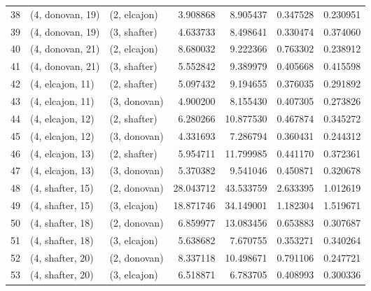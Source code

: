 \begin{tabular}{lllrrrr}
38 &  (4, donovan, 19) &     (2, elcajon) &   3.908868 &   8.905437 &   0.347528 &  0.230951 \\
39 &  (4, donovan, 19) &     (3, shafter) &   4.633733 &   8.498641 &   0.330474 &  0.374060 \\
40 &  (4, donovan, 21) &     (2, elcajon) &   8.680032 &   9.222366 &   0.763302 &  0.238912 \\
41 &  (4, donovan, 21) &     (3, shafter) &   5.552842 &   9.389979 &   0.405668 &  0.415598 \\
42 &  (4, elcajon, 11) &     (2, shafter) &   5.097432 &   9.194655 &   0.376035 &  0.291892 \\
43 &  (4, elcajon, 11) &     (3, donovan) &   4.900200 &   8.155430 &   0.407305 &  0.273826 \\
44 &  (4, elcajon, 12) &     (2, shafter) &   6.280266 &  10.877530 &   0.467874 &  0.345272 \\
45 &  (4, elcajon, 12) &     (3, donovan) &   4.331693 &   7.286794 &   0.360431 &  0.244312 \\
46 &  (4, elcajon, 13) &     (2, shafter) &   5.954711 &  11.799985 &   0.441170 &  0.372361 \\
47 &  (4, elcajon, 13) &     (3, donovan) &   5.370382 &   9.541046 &   0.450871 &  0.320678 \\
48 &  (4, shafter, 15) &     (2, donovan) &  28.043712 &  43.533759 &   2.633395 &  1.012619 \\
49 &  (4, shafter, 15) &     (3, elcajon) &  18.871746 &  34.149001 &   1.182304 &  1.519671 \\
50 &  (4, shafter, 18) &     (2, donovan) &   6.859977 &  13.083456 &   0.653883 &  0.307687 \\
51 &  (4, shafter, 18) &     (3, elcajon) &   5.638682 &   7.670755 &   0.353271 &  0.340264 \\
52 &  (4, shafter, 20) &     (2, donovan) &   8.337118 &  10.498671 &   0.791106 &  0.247721 \\
53 &  (4, shafter, 20) &     (3, elcajon) &   6.518871 &   6.783705 &   0.408993 &  0.300336 \\
\bottomrule
\end{tabular}
